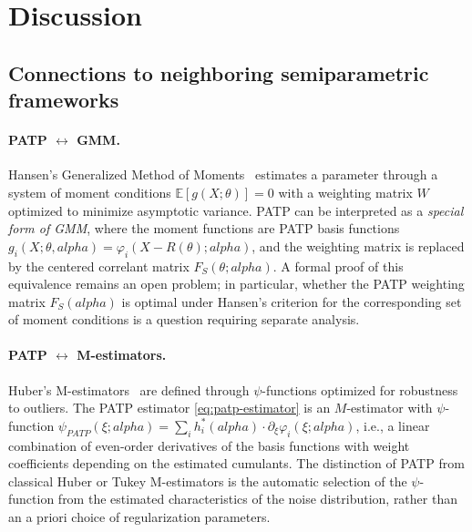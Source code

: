 \documentclass[11pt]{article}
\def\alpha{alpha}%
\def\mathbf#1{#1}%
\def\mathrm#1{#1}%
\theoremstyle{definition}
\newcommand{\E}{\mathbb{E}}
\newcommand{\PATP}{\mathrm{PATP}}
\begin{document}
\section{Discussion}\label{sec:discussion}

\subsection{Connections to neighboring semiparametric frameworks}\label{sec:disc:related}

\paragraph{PATP $\leftrightarrow$ GMM.}
Hansen's Generalized Method of Moments~\citep{hansen1982gmm} estimates a
parameter through a system of moment conditions
$\E[g(X; \theta)] = 0$ with a weighting matrix $W$ optimized to minimize
asymptotic variance. PATP can be interpreted as a \emph{special form of GMM},
where the moment functions are PATP basis functions
$g_i(X; \theta, \alpha) = \varphi_i(X - R(\theta); \alpha)$, and the
weighting matrix is replaced by the centered correlant matrix
$\mathbf{F}_S(\theta; \alpha)$. A formal proof of this equivalence remains
an open problem; in particular, whether the PATP weighting matrix
$\mathbf{F}_S(\alpha)$ is optimal under Hansen's criterion for the
corresponding set of moment conditions is a question requiring separate
analysis.

\paragraph{PATP $\leftrightarrow$ M-estimators.}
Huber's M-estimators~\citep{huber1981robust} are defined through
$\psi$-functions optimized for robustness to outliers. The PATP estimator
\eqref{eq:patp-estimator} is an $M$-estimator with $\psi$-function
$\psi_{\PATP}(\xi; \alpha) = \sum_i h_i^{*}(\alpha) \cdot
\partial_{\xi}\varphi_i(\xi; \alpha)$, i.e., a linear combination of
even-order derivatives of the basis functions with weight coefficients
depending on the estimated cumulants. The distinction of PATP from
classical Huber or Tukey M-estimators is the automatic selection of the
$\psi$-function from the estimated characteristics of the noise distribution,
rather than an a priori choice of regularization parameters.
\end{document}
